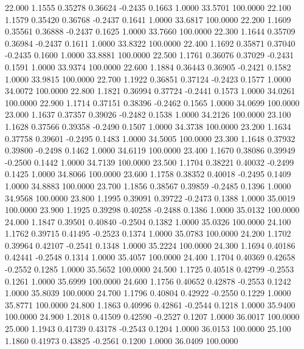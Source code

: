   22.000   1.1555   0.35278   0.36624  -0.2435   0.1663   1.0000  33.5701 100.0000
  22.100   1.1579   0.35420   0.36768  -0.2437   0.1641   1.0000  33.6817 100.0000
  22.200   1.1609   0.35561   0.36888  -0.2437   0.1625   1.0000  33.7660 100.0000
  22.300   1.1644   0.35709   0.36984  -0.2437   0.1611   1.0000  33.8322 100.0000
  22.400   1.1692   0.35871   0.37040  -0.2435   0.1600   1.0000  33.8881 100.0000
  22.500   1.1761   0.36076   0.37029  -0.2431   0.1591   1.0000  33.9374 100.0000
  22.600   1.1884   0.36443   0.36905  -0.2421   0.1582   1.0000  33.9815 100.0000
  22.700   1.1922   0.36851   0.37124  -0.2423   0.1577   1.0000  34.0072 100.0000
  22.800   1.1821   0.36994   0.37724  -0.2441   0.1573   1.0000  34.0261 100.0000
  22.900   1.1714   0.37151   0.38396  -0.2462   0.1565   1.0000  34.0699 100.0000
  23.000   1.1637   0.37357   0.39026  -0.2482   0.1538   1.0000  34.2126 100.0000
  23.100   1.1628   0.37566   0.39358  -0.2490   0.1507   1.0000  34.3738 100.0000
  23.200   1.1634   0.37758   0.39601  -0.2495   0.1483   1.0000  34.5005 100.0000
  23.300   1.1648   0.37932   0.39800  -0.2498   0.1462   1.0000  34.6119 100.0000
  23.400   1.1670   0.38086   0.39949  -0.2500   0.1442   1.0000  34.7139 100.0000
  23.500   1.1704   0.38221   0.40032  -0.2499   0.1425   1.0000  34.8066 100.0000
  23.600   1.1758   0.38352   0.40018  -0.2495   0.1409   1.0000  34.8883 100.0000
  23.700   1.1856   0.38567   0.39859  -0.2485   0.1396   1.0000  34.9568 100.0000
  23.800   1.1995   0.39091   0.39722  -0.2473   0.1388   1.0000  35.0019 100.0000
  23.900   1.1925   0.39298   0.40258  -0.2488   0.1386   1.0000  35.0132 100.0000
  24.000   1.1847   0.39501   0.40840  -0.2504   0.1382   1.0000  35.0326 100.0000
  24.100   1.1762   0.39715   0.41495  -0.2523   0.1374   1.0000  35.0783 100.0000
  24.200   1.1702   0.39964   0.42107  -0.2541   0.1348   1.0000  35.2224 100.0000
  24.300   1.1694   0.40186   0.42441  -0.2548   0.1314   1.0000  35.4057 100.0000
  24.400   1.1704   0.40369   0.42658  -0.2552   0.1285   1.0000  35.5652 100.0000
  24.500   1.1725   0.40518   0.42799  -0.2553   0.1261   1.0000  35.6999 100.0000
  24.600   1.1756   0.40652   0.42878  -0.2553   0.1242   1.0000  35.8039 100.0000
  24.700   1.1796   0.40804   0.42922  -0.2550   0.1229   1.0000  35.8771 100.0000
  24.800   1.1863   0.40996   0.42861  -0.2544   0.1218   1.0000  35.9400 100.0000
  24.900   1.2018   0.41509   0.42590  -0.2527   0.1207   1.0000  36.0017 100.0000
  25.000   1.1943   0.41739   0.43178  -0.2543   0.1204   1.0000  36.0153 100.0000
  25.100   1.1860   0.41973   0.43825  -0.2561   0.1200   1.0000  36.0409 100.0000
